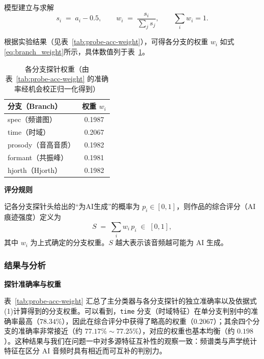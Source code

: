 \documentclass[aspectratio=169]{beamer}
\providecommand{\paragraph}[1]{\smallskip\textbf{#1}\par}
\begin{document}
\begin{frame}{模型建立与求解}
\begin{equation}
    s_i \;=\; a_i - 0.5,\qquad 
    w_i \;=\; \frac{s_i}{\sum_j s_j},\qquad 
    \sum_i w_i = 1.
    \label{eq:branch_weight}
\end{equation}

根据实验结果（见表~\ref{tab:probe-acc-weight}），可得各分支的权重 $w_i$ 如式\ref{eq:branch_weight}所示，具体数值列于表~\ref{tab:branch-weights}。

\begin{table}[htbp]
\centering
\caption{各分支探针权重（由表~\ref{tab:probe-acc-weight} 的准确率经机会校正归一化得到）}
\label{tab:branch-weights}
\begin{tabular}{lc}
\toprule
分支（Branch） & 权重 $w_i$ \\
\midrule
spec（频谱图）      & 0.1987 \\
time（时域）        & 0.2067 \\
prosody（音高音质） & 0.1982 \\
formant（共振峰）   & 0.1981 \\
hjorth（Hjorth）    & 0.1982 \\
\bottomrule
\end{tabular}
\end{table}




\paragraph{评分规则} 记各分支探针头给出的“为AI生成”的概率为
$p_i\in[0,1]$，则作品的综合评分（AI痕迹强度）定义为
\begin{equation}
    S \;=\; \sum_{i} w_i\, p_i \;\in\;[0,1],
    \label{eq:ai_score}
\end{equation}
其中 $w_i$ 为上式确定的分支权重。$S$ 越大表示该音频越可能为 AI 生成。

\subsubsection{结果与分析}
\paragraph{探针准确率与权重} 表~\ref{tab:probe-acc-weight} 汇总了主分类器与各分支探针的独立准确率以及依据式(1)计算得到的分支权重。可以看到，\texttt{time} 分支（时域特征）在单分支判别中的准确率最高（$78.34\%$），因此在综合评分中获得了略高的权重（$0.2067$）；其余四个分支的准确率非常接近（约 $77.17\%\sim77.25\%$），对应的权重也基本均衡（约 $0.198$）。这种结果与我们在问题一中对多源特征互补性的观察一致：频谱类与声学统计特征在区分 AI 音频时具有相近而可互补的判别力。


\end{frame}
\end{document}
